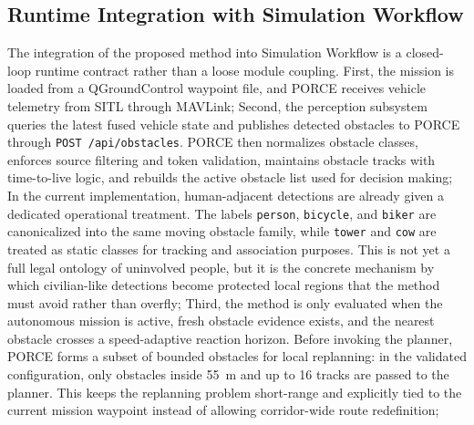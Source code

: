 \documentclass[journal,twoside,web]{ieeecolor}
\begin{document}
\subsection{Runtime Integration with Simulation Workflow}
The integration of the proposed method into Simulation Workflow is a closed-loop runtime contract rather than a loose module coupling. 
\newline
First, the mission is loaded from a QGroundControl waypoint file, and PORCE receives vehicle telemetry from SITL through MAVLink;
\newline 
Second, the perception subsystem queries the latest fused vehicle state and publishes detected obstacles to PORCE through \texttt{POST /api/obstacles}. PORCE then normalizes obstacle classes, enforces source filtering and token validation, maintains obstacle tracks with time-to-live logic, and rebuilds the active obstacle list used for decision making;
\newline
In the current implementation, human-adjacent detections are already given a dedicated operational treatment. The labels \texttt{person}, \texttt{bicycle}, and \texttt{biker} are canonicalized into the same moving obstacle family, while \texttt{tower} and \texttt{cow} are treated as static classes for tracking and association purposes. This is not yet a full legal ontology of uninvolved people, but it is the concrete mechanism by which civilian-like detections become protected local regions that the method must avoid rather than overfly;
\newline
Third, the method is only evaluated when the autonomous mission is active, fresh obstacle evidence exists, and the nearest obstacle crosses a speed-adaptive reaction horizon. Before invoking the planner, PORCE forms a subset of bounded obstacles for local replanning: in the validated configuration, only obstacles inside \SI{55}{\meter} and up to 16 tracks are passed to the planner. This keeps the replanning problem short-range and explicitly tied to the current mission waypoint instead of allowing corridor-wide route redefinition; 
\end{document}
